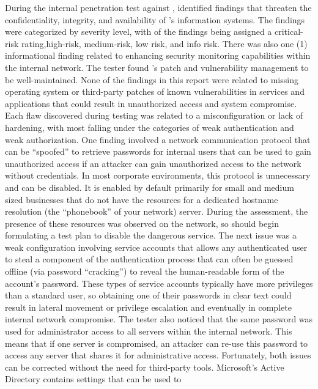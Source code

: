 \qquad During the internal penetration test against \enterpriseName, \brandName identified  \the\numexpr\totalCount\relax findings that
threaten the confidentiality, integrity, and availability of \enterpriseName’s information systems. The findings were
categorized by severity level, with \countCritical of the findings being assigned a critical-risk rating,\countHigh high-risk, \countMedium medium-risk, 
\countLow low risk, and \countInfo info risk. There was also one (1) informational finding related to enhancing security monitoring capabilities within the
internal network.
The tester found \enterpriseName’s patch and vulnerability management to be well-maintained. None of the findings in this
report were related to missing operating system or third-party patches of known vulnerabilities in services and
applications that could result in unauthorized access and system compromise. Each flaw discovered during testing was
related to a misconfiguration or lack of hardening, with most falling under the categories of weak authentication and
weak authorization.
One finding involved a network communication protocol that can be “spoofed” to retrieve passwords for internal users
that can be used to gain unauthorized access if an attacker can gain unauthorized access to the network without
credentials. In most corporate environments, this protocol is unnecessary and can be disabled. It is enabled by default
primarily for small and medium sized businesses that do not have the resources for a dedicated hostname resolution (the
“phonebook” of your network) server. During the assessment, the presence of these resources was observed on the
network, so \enterpriseName should begin formulating a test plan to disable the dangerous service.
The next issue was a weak configuration involving service accounts that allows any authenticated user to steal a
component of the authentication process that can often be guessed offline (via password “cracking”) to reveal the
human-readable form of the account’s password. These types of service accounts typically have more privileges than a
standard user, so obtaining one of their passwords in clear text could result in lateral movement or privilege escalation
and eventually in complete internal network compromise. The tester also noticed that the same password was used for
administrator access to all servers within the internal network. This means that if one server is compromised, an attacker
can re-use this password to access any server that shares it for administrative access. Fortunately, both issues can be
corrected without the need for third-party tools. Microsoft’s Active Directory contains settings that can be used to
